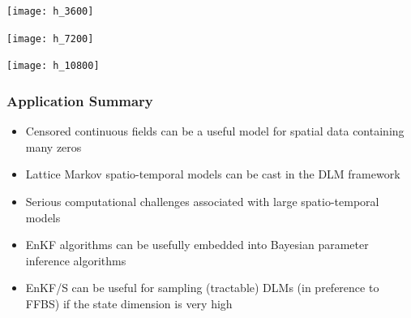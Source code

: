 \begin{frame}
\centerline{\texttt{[image: h\_3600]}}
\end{frame}

\begin{frame}
\centerline{\texttt{[image: h\_7200]}}
\end{frame}

\begin{frame}
\centerline{\texttt{[image: h\_10800]}}
\end{frame}

\begin{frame}
  \frametitle{Application Summary}
  \begin{itemize}
  \item Censored continuous fields can be a useful model for spatial data containing many zeros
  \item Lattice Markov spatio-temporal models can be cast in the DLM framework
    \item Serious computational challenges associated with large spatio-temporal models
  \item EnKF algorithms can be usefully embedded into Bayesian parameter inference algorithms
    \item EnKF/S can be useful for sampling (tractable) DLMs (in preference to FFBS) if the state dimension is very high
  \end{itemize}
  \vfill

  
\end{frame}



